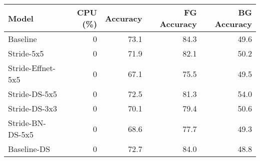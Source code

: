 \begin{tabular}{lrrrr}
\toprule
             Model &  CPU (\%) &  Accuracy &  FG Accuracy &  BG Accuracy \\
\midrule
          Baseline &        0 &      73.1 &         84.3 &         49.6 \\
        Stride-5x5 &        0 &      71.9 &         82.1 &         50.2 \\
 Stride-Effnet-5x5 &        0 &      67.1 &         75.5 &         49.5 \\
     Stride-DS-5x5 &        0 &      72.5 &         81.3 &         54.0 \\
     Stride-DS-3x3 &        0 &      70.1 &         79.4 &         50.6 \\
  Stride-BN-DS-5x5 &        0 &      68.6 &         77.7 &         49.3 \\
       Baseline-DS &        0 &      72.7 &         84.0 &         48.8 \\
\bottomrule
\end{tabular}
